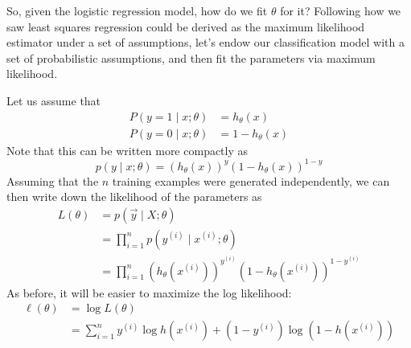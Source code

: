 So, given the logistic regression model, how do we fit $\theta$ for it? Following
how we saw least squares regression could be derived as the maximum likelihood
estimator under a set of assumptions, let's endow our classification
model with a set of probabilistic assumptions, and then fit the parameters
via maximum likelihood.

Let us assume that
\begin{align*}
    P(y = 1 \mid x;\theta) &= h_\theta (x)\\
    P(y = 0 \mid x;\theta) &= 1 - h_\theta (x)
\end{align*}
Note that this can be written more compactly as
\begin{equation}
    p(y \mid x;\theta) = (h_\theta (x))^y (1 - h_\theta (x))^{1-y}
\end{equation}
Assuming that the $n$ training examples were generated independently, we
can then write down the likelihood of the parameters as
\begin{align}
    L(\theta) &= p(\vec y \mid X;\theta)\\
    &= \prod^n_{i=1} p(y^{(i)} \mid x^{(i)} ;\theta)\\
    &= \prod^n_{i=1} \left( h_\theta(x^{(i)}) \right)^{y^{(i)}} \left( 1 - h_\theta (x^{(i)}) \right)^{1-y^{(i)}}
\end{align}
As before, it will be easier to maximize the log likelihood:
\begin{align}
    \ell(\theta) &= \log L(\theta)\\
    &= \sum_{i=1}^n y^{(i)} \log h(x^{(i)}) + (1 - y^{(i)})\log(1 - h(x^{(i)}))
\end{align}

